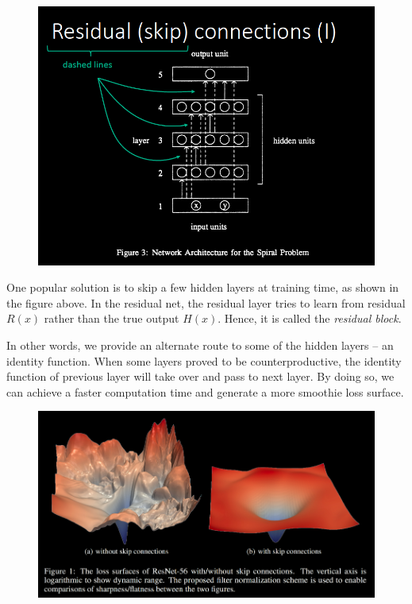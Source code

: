 \begin{figure}[ht]
    \centering
    \includegraphics[scale=0.3]{figs/skip_connection.png}
\end{figure}

One popular solution is to skip a few hidden layers at training time, as shown in the figure above. In the residual net, the residual layer tries to learn from residual $R(x)$ rather than the true output $H(x)$. Hence, it is called the \textit{residual block}.

In other words, we provide an alternate route to some of the hidden layers -- an identity function. When some layers proved to be counterproductive, the identity function of previous layer will take over and pass to next layer. By doing so, we can achieve a faster computation time and generate a more smoothie loss surface.

\begin{figure}[!htb]
    \centering
    \includegraphics[scale=0.3]{figs/with_and_without_skip.png}
\end{figure}

